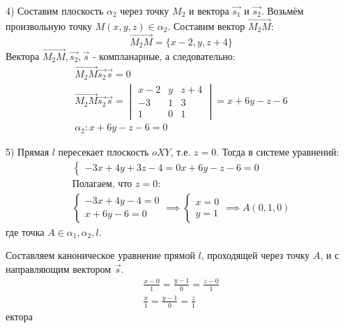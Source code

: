 \begin{eg}
  4) Составим плоскость $\alpha_2$ через точку $M_2$  и вектора $\vec{s_1}$ и $\vec{s_2}$.
  Возьмём произвольную точку $M(x, y, z) \in \alpha_2$.
  Составим вектор $\overrightarrow{M_2M}$: \[
  \overrightarrow{M_2M} = \{x - 2, y, z + 4\} 
  \] 
  Вектора $\overrightarrow{M_2M}, \vec{s_2}, \vec{s}$ - компланарные, а следовательно: 
  \begin{gather*}
    \overrightarrow{M_2M} \vec{s_2} \vec{s} = 0 \\
    \vec{M_2M} \vec{s_2} \vec{s} = 
    \begin{vmatrix}
      x - 2 & y & z + 4 \\
      -3 & 1 & 3 \\
      1 & 0 & 1
    \end{vmatrix} = 
    x + 6y - z - 6 \\
    \boxed{\alpha_2: x + 6y - z - 6 = 0}
  \end{gather*}

  5) Прямая $l$ пересекает плоскость $oXY$, т.е. $z = 0$. Тогда в системе уравнений:
   \begin{gather*}
    \begin{cases}
      -3x + 4y + 3z - 4 = 0
      x + 6y - z - 6 = 0
    \end{cases} \\
    \text{Полагаем, что } z = 0: \\
    \begin{cases}
      -3x + 4y - 4 = 0 \\
      x + 6y - 6 = 0
    \end{cases} \implies \begin{cases}
      x = 0 \\
      y = 1 
    \end{cases} \implies A(0, 1, 0)
  \end{gather*}
  где точка $A \in \alpha_1, \alpha_2, l$.
  
  Составляем каноническое уравнение прямой $l$, проходящей через точку $A$, и с направляющим вектором $\vec{s}$.
  \begin{gather*}
    \frac{x - 0}{1} = \frac{y - 1}{0} = \frac{z - 0}{1} \\
    \boxed{\frac{x}{1} = \frac{y - 1}{0} = \frac{z}{1}}
  \end{gather*}
ектора 
\end{eg}


